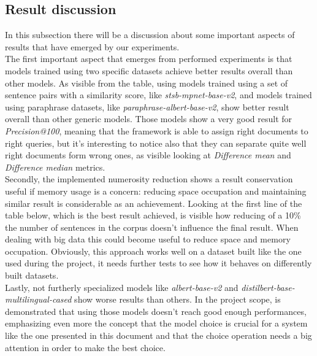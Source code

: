 \documentclass[\main/main.tex]{subfiles}
\begin{document}
\subsection{Result discussion}
In this subsection there will be a discussion about some important aspects of results that have emerged by our experiments. \\
The first important aspect that emerges from performed experiments is that models trained using two specific datasets achieve better results overall than other models. As visible from the table, using models trained using a set of sentence pairs with a similarity score, like \emph{stsb-mpnet-base-v2}, and models trained using paraphrase datasets, like \emph{paraphrase-albert-base-v2}, show better result overall than other generic models. Those models show a very good result for \emph{Precision@100}, meaning that the framework is able to assign right documents to right queries, but it's interesting to notice also that they can separate quite well right documents form wrong ones, as visible looking at \emph{Difference mean} and \emph{Difference median} metrics.\\
Secondly, the implemented numerosity reduction shows a result conservation useful if memory usage is a concern: reducing space occupation and maintaining similar result is considerable as an achievement. Looking at the first line of the table below, which is the best result achieved, is visible how reducing of a 10\% the number of sentences in the corpus doesn't influence the final result. When dealing with big data this could become useful to reduce space and memory occupation. Obviously, this approach works well on a dataset built like the one used during the project, it needs further tests to see how it behaves on differently built datasets.\\
Lastly, not furtherly specialized models like \emph{albert-base-v2} and \emph{distilbert-base-multilingual-cased} show worse results than others. In the project scope, is demonstrated that using those models doesn't reach good enough performances, emphasizing even more the concept that the model choice is crucial for a system like the one presented in this document and that the choice operation needs a big attention in order to make the best choice.
\end{document}
